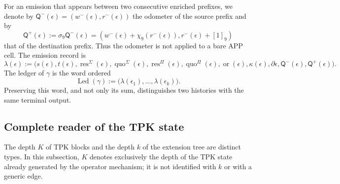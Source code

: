 \begin{definition}
\label{def:continuo-comun-ledger-elemental}
For an emission that appears between two consecutive enriched prefixes,
we denote by
\(\mathsf Q^-(\epsilon)=(w^-(\epsilon),r^-(\epsilon))\) the odometer of the
source prefix and by
\begin{equation}
\label{eq:continuo-comun-ledger-fase-extremos}
 \mathsf Q^+(\epsilon):=\sigma_9\mathsf Q^-(\epsilon)
 =(w^-(\epsilon)+\chi_9(r^-(\epsilon)),r^-(\epsilon)+[1]_9)
\end{equation}
that of the destination prefix. Thus the odometer is not applied to a bare APP
cell. The emission record is
\begin{equation}
\label{eq:continuo-comun-ledger-elemental}
 \lambda(\epsilon):=\bigl(
 s(\epsilon),t(\epsilon),
 \operatorname{res}^{\Sigma}(\epsilon),
 \operatorname{quo}^{\Sigma}(\epsilon),
 \operatorname{res}^{\Pi}(\epsilon),
 \operatorname{quo}^{\Pi}(\epsilon),
 \operatorname{or}(\epsilon),
 \kappa(\epsilon),
 \partial\epsilon,
 \mathsf Q^-(\epsilon),\mathsf Q^+(\epsilon)\bigr).
\end{equation}
The ledger of \(\gamma\) is the word ordered
\begin{equation}
\label{eq:continuo-comun-ledger-ruta}
 \operatorname{Led}(\gamma)
 :=\bigl(\lambda(\epsilon_1),\ldots,
          \lambda(\epsilon_k)\bigr).
\end{equation}
Preserving this word, and not only its sum, distinguishes two histories with the same terminal output.
\end{definition}

\subsection{Complete reader of the TPK state}
\label{sec:continuo-comun-lector-estado-tpk}

The depth \(K\) of TPK blocks and the depth \(k\) of the
extension tree are distinct types. In this subsection, \(K\) denotes
exclusively the depth of the TPK state already generated by the operator
mechanism; it is not identified with \(k\) or with a generic edge.

